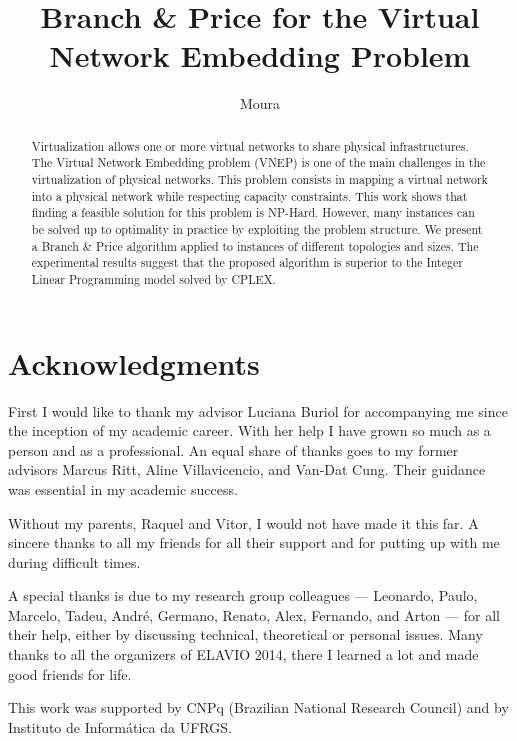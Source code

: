 \documentclass[ppgc,diss,english]{iiufrgs}
\title{Branch \& Price for the Virtual Network Embedding Problem}
\author{Moura}{Leonardo F.S.}
\date{}{2015}
\begin{document}
\maketitle

\chapter*{Acknowledgments}
First I would like to thank my advisor Luciana Buriol for accompanying me since the inception of my academic career.
With her help I have grown so much as a person and as a professional. 
An equal share of thanks goes to my former advisors Marcus Ritt, Aline Villavicencio, and Van-Dat Cung.
Their guidance was essential in my academic success.

Without my parents, Raquel and Vitor, I would not have made it this far.
A sincere thanks to all my friends for all their support and for putting up with me during difficult times.

A special thanks is due to my research group colleagues --- Leonardo, Paulo, Marcelo, Tadeu, André, Germano, Renato, Alex, Fernando, and Arton ---
for all their help, either by discussing technical, theoretical or personal issues.
Many thanks to all the organizers of ELAVIO 2014, there I learned a lot and made good friends for life.

This work was supported by CNPq (Brazilian National Research Council) and by Instituto de Informática da UFRGS.

\begin{abstract}
Virtualization allows one or more virtual networks to share physical infrastructures.
The Virtual Network Embedding problem (VNEP) is one of the main challenges in the virtualization of physical networks. 
This problem consists in mapping a virtual network into a physical network while respecting capacity constraints.
This work shows that finding a feasible solution for this problem is NP-Hard.
However, many instances can be solved up to optimality in practice by exploiting the problem structure.
We present a Branch \& Price algorithm applied to instances of different topologies and sizes.
The experimental results suggest that the proposed algorithm is superior to the Integer Linear Programming model solved by CPLEX.
\end{abstract}
\end{document}
